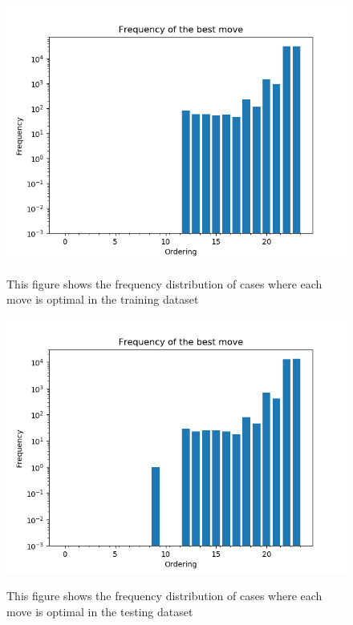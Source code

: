 \begin{figure}
\centering
\includegraphics[scale=0.75]{trainingb1.png}\\
\caption{This figure shows the frequency distribution of cases where each move is optimal in the training dataset}
\label{fig:trainingb1}
\end{figure}

\begin{figure}
\centering
\includegraphics[scale=0.75]{testingb1.png}\\
\caption{This figure shows the frequency distribution of cases where each move is optimal in the testing dataset}
\label{fig:testingb1}
\end{figure}

